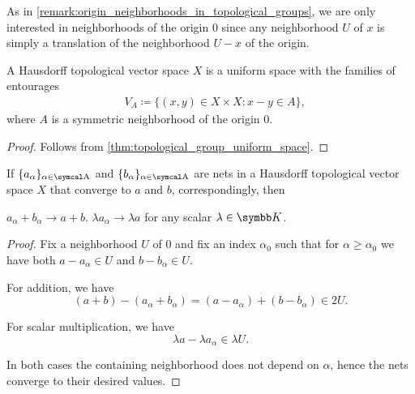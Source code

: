 \begin{remark}\label{remark:origin_neighborhoods_in_topological_vector_spaces}
  As in \cref{remark:origin_neighborhoods_in_topological_groups}, we are only interested in neighborhoods of the origin \( 0 \) since any neighborhood \( U \) of \( x \) is simply a translation of the neighborhood \( U - x \) of the origin.
\end{remark}

\begin{proposition}\label{thm:topological_vector_space_is_uniform}
  A Hausdorff topological vector space \( X \) is a uniform space with the families of entourages
  \begin{align*}
    &V_A \coloneqq \{ (x, y) \in X \times X \colon x - y \in A \},
  \end{align*}
  where \( A \) is a symmetric neighborhood of the origin \( 0 \).
\end{proposition}
\begin{proof}
  Follows from \cref{thm:topological_group_uniform_space}.
\end{proof}

\begin{proposition}\label{thm:linearity_of_sequence_limits}
  If \( \{ a_\alpha \}_{\alpha \in \A} \) and \( \{ b_\alpha \}_{\alpha \in \A} \) are nets in a Hausdorff topological vector space \( X \) that converge to \( a \) and \( b \), correspondingly, then
  \begin{thmenum}
     \( a_\alpha + b_\alpha \to a + b \).
     \( \lambda a_\alpha \to \lambda a \) for any scalar \( \lambda \in \K \).
  \end{thmenum}
\end{proposition}
\begin{proof}
  Fix a neighborhood \( U \) of \( 0 \) and fix an index \( \alpha_0 \) such that for \( \alpha \geq \alpha_0 \) we have both \( a - a_\alpha \in U \) and \( b - b_\alpha \in U \).

  \begin{description}
     For addition, we have
    \begin{equation*}
      (a + b) - (a_\alpha + b_\alpha) = (a - a_\alpha) + (b - b_\alpha) \in 2U.
    \end{equation*}

     For scalar multiplication, we have
    \begin{equation*}
      \lambda a - \lambda a_\alpha \in \lambda U.
    \end{equation*}
  \end{description}

  In both cases the containing neighborhood does not depend on \( \alpha \), hence the nets converge to their desired values.
\end{proof}

